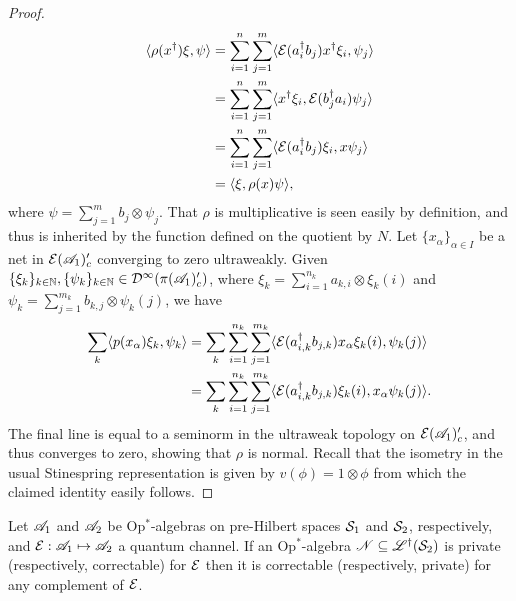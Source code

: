 \documentclass[12pt]{article}
\begin{document}
\begin{proof}
\begin{align*}
		\langle \rho(x^\dagger)\xi, \psi \rangle &= \sum_{i=1}^n\sum^m_{j=1}\langle \mathcal{E}(a_i^\dagger b_j)x^\dagger \xi_i, \psi_j \rangle \\
					      &= \sum_{i=1}^n\sum^m_{j=1}\langle x^\dagger \xi_i, \mathcal{E}(b_j^\dagger a_i)\psi_j \rangle \\
					      &= \sum_{i=1}^n\sum^m_{j=1}\langle \mathcal{E}(a_i^\dagger b_j)\xi_i, x\psi_j \rangle \\
					     &= \langle \xi, \rho(x)\psi \rangle,
	\end{align*}
	where $\psi = \sum_{j = 1}^m b_j \otimes \psi_j$.
	That $\rho$ is multiplicative is seen easily by definition, and thus is inherited by the function defined on the quotient by $N$.
	Let $\{x_\alpha\}_{\alpha \in I}$ be a net in $\mathcal{E}(\mathscr{A}_1)'_c$ converging to zero ultraweakly. 
	Given $\{\xi_k\}_{k \in \mathbb{N}}, \{\psi_k\}_{k \in \mathbb{N}} \in \mathcal{D}^\infty(\pi(\mathscr{A}_1)'_c)$, where $\xi_k = \sum_{i = 1}^{n_k} a_{k,i} \otimes \xi_k(i)$
	and $\psi_k = \sum_{j = 1}^{m_k}b_{k,j} \otimes \psi_k(j)$, we have
	\begin{align*}
		\sum_{k}\langle p(x_\alpha)\xi_k, \psi_k \rangle &= \sum_{k}\sum_{i=1}^{n_k}\sum_{j=1}^{m_k}\langle \mathcal{E}(a^\dagger_{i,k}b_{j,k})x_\alpha\xi_k(i), \psi_k(j) \rangle \\
						      &= \sum_{k}\sum_{i = 1}^{n_k}\sum_{j=1}^{m_k}\langle \mathcal{E}(a^\dagger_{i,k}b_{j,k})\xi_k(i), x_\alpha\psi_k(j) \rangle.
	\end{align*}
	The final line is equal to a seminorm in the ultraweak topology on $\mathcal{E}(\mathscr{A}_1)'_c$, and thus converges to zero, showing that $\rho$ is normal. Recall that the
	isometry in the usual Stinespring representation is given by $v(\phi) = 1 \otimes \phi$ from which the claimed identity easily follows.

\end{proof}


\begin{theorem}
	
	Let $\mathscr{A}_1$ and $\mathscr{A}_2$ be Op$^*$-algebras on pre-Hilbert spaces
	$\mathcal{S}_1$ and $\mathcal{S}_2$, respectively, and $\mathcal{E}: \mathscr{A}_1 \mapsto \mathscr{A}_2$ 
	a quantum channel. If an Op$^*$-algebra $\mathscr{N} \subseteq \mathscr{L}^\dagger(\mathcal{S}_2)$ 
	is private (respectively, correctable) for $\mathcal{E}$ then it is 
	correctable (respectively, private) for any complement of $\mathcal{E}$.

\end{theorem}
\end{document}
